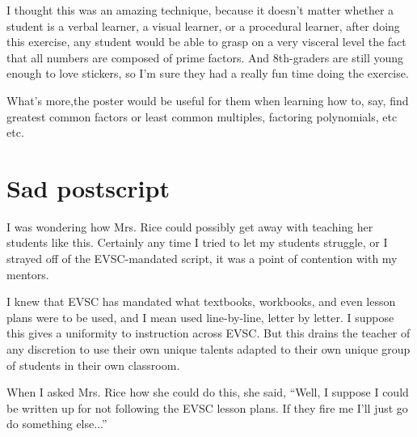 \documentclass[11pt]{elegantbook}
\begin{document}
I thought this was an amazing technique, because it doesn't matter whether
a student is a verbal learner, a visual learner, or a procedural learner,
after doing this exercise, any student would be able to grasp on a very
visceral level the fact that all numbers are composed of prime factors.  And 8th-graders
are still young enough to love stickers, so I'm sure they had a really fun time
doing the exercise.

What's more,the poster would be useful for them when learning how to,
say, find greatest common factors or least common multiples, factoring
polynomials, etc etc.

\section*{Sad postscript}

I was wondering how Mrs. Rice could possibly get away with teaching
her students like this.  Certainly any time I tried to let my students
struggle, or I strayed off of the EVSC-mandated script, it was a point
of contention with my mentors.

I knew that EVSC has mandated what textbooks, workbooks, and even
lesson plans were to be used, and I mean used line-by-line, letter by
letter.  I suppose this gives a uniformity to instruction across
EVSC. But this drains the teacher of any discretion to use their own
unique talents adapted to their own unique group of students in their
own classroom.

When I asked Mrs. Rice how she could do this, she said, ``Well, I
suppose I could be written up for not following the EVSC lesson
plans.  If they fire me I'll just go do something else...''
\end{document}
